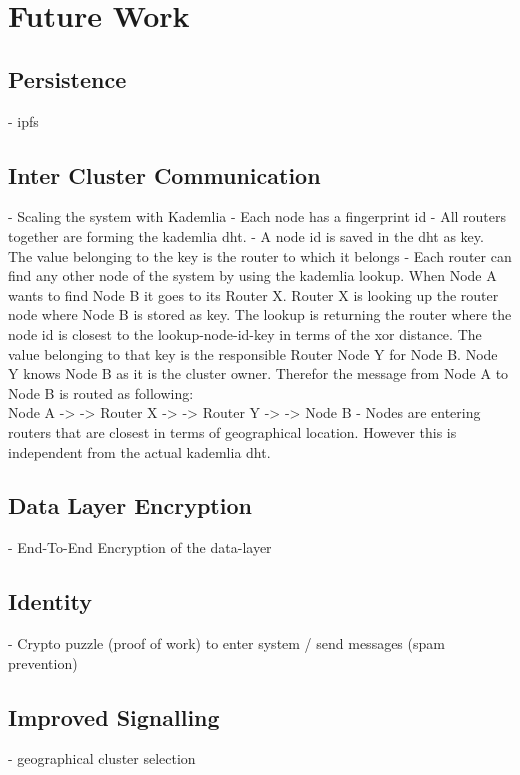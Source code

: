 \section{Future Work}

\subsection{Persistence}
- ipfs

\subsection{Inter Cluster Communication}
- Scaling the system with Kademlia
    - Each node has a fingerprint id
    - All routers together are forming the kademlia dht.
    - A node id is saved in the dht as key. The value belonging to the key is the router to which it belongs 
    - Each router can find any other node of the system by using the kademlia lookup. When Node A wants to find Node B it goes to its Router X. Router X is looking up the router node where Node B is stored as key. The lookup is returning the router where the node id is closest to the lookup-node-id-key in terms of the \gls{xor} distance. The value belonging to that key is the responsible Router Node Y for Node B. Node Y knows Node B as it is the cluster owner. Therefor the message from Node A to Node B is routed as following: \\ Node A -> -> Router X -> -> Router Y -> -> Node B
    - Nodes are entering routers that are closest in terms of geographical location. However this is independent from the actual kademlia dht.

\subsection{Data Layer Encryption}
- End-To-End Encryption of the data-layer

\subsection{Identity}
- Crypto puzzle (proof of work) to enter system / send messages (spam prevention)

\subsection{Improved Signalling}
- geographical cluster selection

